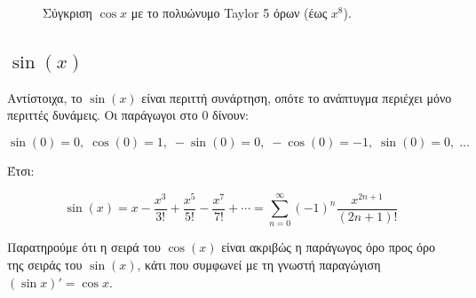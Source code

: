 \documentclass[a4paper, 11pt]{article}
\begin{document}
\begin{figure}[htbp]
\centering
{}
\caption{Σύγκριση $\cos x$ με το πολυώνυμο Taylor 5 όρων (έως $x^8$).}
\label{fig:costaylor5}
\par
\end{figure}

\subsection{\texorpdfstring{\(\sin(x)\)}{\textbackslash sin(x)}}\label{sinx}

Αντίστοιχα, το \(\sin(x)\) είναι περιττή συνάρτηση, οπότε το ανάπτυγμα
περιέχει μόνο περιττές δυνάμεις. Οι παράγωγοι στο \(0\) δίνουν:

\[
\sin(0)=0,\; \cos(0)=1,\; -\sin(0)=0,\; -\cos(0)=-1,\; \sin(0)=0,\; \dots
\]

Έτσι:

\[
\sin(x) = x - \frac{x^3}{3!} + \frac{x^5}{5!} - \frac{x^7}{7!} + \cdots = \sum_{n=0}^{\infty} (-1)^n \frac{x^{2n+1}}{(2n+1)!}
\]

Παρατηρούμε ότι η σειρά του \(\cos(x)\) είναι ακριβώς η παράγωγος όρο
προς όρο της σειράς του \(\sin(x)\), κάτι που συμφωνεί με τη γνωστή
παραγώγιση \((\sin x)' = \cos x\).
\end{document}

